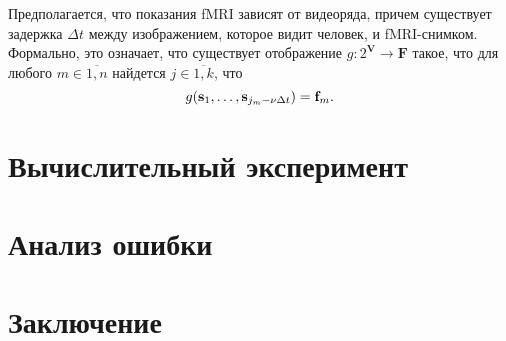 \documentclass[a4paper, 12pt]{article}
\begin{document}
	Предполагается, что показания fMRI зависят от видеоряда, причем существует задержка
	$\Delta t$ между изображением, которое видит человек, и fMRI-снимком. Формально, это означает,
	что существует отображение $g: 2^{\mathbf{V}} \to \mathbf{F}$ такое, что для любого
	$m \in \overline{1, n}$ найдется $j \in \overline{1, k}$, что
	\begin{equation}
		g(\mathbf{s}_1, \ldots, \mathbf{s}_{j_m - \nu \Delta t}) = \mathbf{f}_m.
	\end{equation}

\section{Вычислительный эксперимент}

\section{Анализ ошибки}

\section{Заключение}



\end{document}
